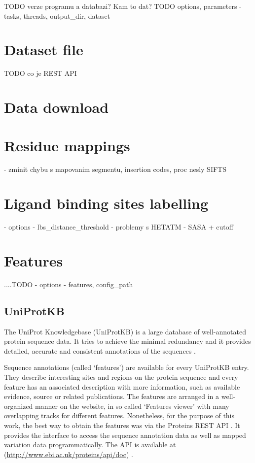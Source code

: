 TODO verze programu a databazi? Kam to dat?
TODO options, parameters - tasks, threads, output\_dir, dataset

\section{Dataset file}
TODO co je REST API

\section{Data download}

\section{Residue mappings}
- zminit chybu s mapovanim segmentu, insertion codes, proc nesly SIFTS

\section{Ligand binding sites labelling}
- options - lbs\_distance\_threshold
- problemy s HETATM
- SASA + cutoff

\section{Features}

....TODO
- options - features, config\_path

\subsection{UniProtKB}

The UniProt Knowledgebase (UniProtKB) is a large database of well-annotated protein sequence data. It tries to achieve the minimal redundancy and it provides detailed, accurate and consistent annotations of the sequences \cite{uniprot}.

Sequence annotations (called `features') are available for every UniProtKB entry. They describe interesting sites and regions on the protein sequence and every feature has an associated description with more information, such as available evidence, source or related publications. The features are arranged in a well-organized manner on the website, in so called `Features viewer' with many overlapping tracks for different features. Nonetheless, for the purpose of this work, the best way to obtain the features was via the Proteins REST API \cite{proteins_api}. It provides the interface to  access the sequence annotation data as well as mapped variation data programmatically. The API is available at (\url{http://www.ebi.ac.uk/proteins/api/doc}) \cite{TODO}.

